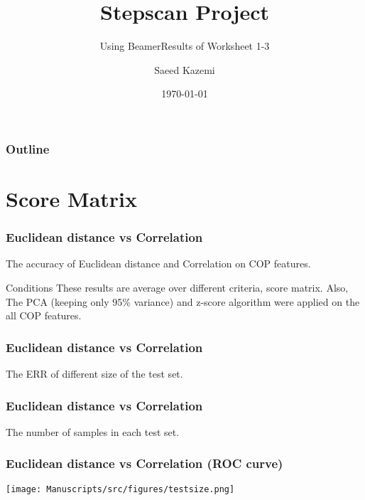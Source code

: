 \documentclass{beamer}
\subtitle{Using Beamer}
\title{ \textbf{Stepscan Project}}
\subtitle{Results of Worksheet 1-3}
\date{\today}
\author{Saeed Kazemi}
\institute{ University of New Brunswick}
\begin{document}
\begin{frame}
\titlepage
\end{frame}


\begin{frame}
\frametitle{Outline}
\tableofcontents
\end{frame}


\section{Score Matrix}

\begin{frame}
\frametitle{Euclidean distance vs Correlation}
\tiny
\begin{table}
\centering
\captionsetup{labelformat=empty}
\caption{\small The accuracy of Euclidean distance and Correlation on COP features.}

\end{table}
\begin{block}{\small Conditions}
    \footnotesize These results are average over different criteria, score matrix. Also, The PCA (keeping only 95\% variance) and z-score algorithm were applied on the all COP features.
\end{block}

\end{frame}
\begin{frame}
\frametitle{Euclidean distance vs Correlation}
\tiny
\begin{table}
\centering
\captionsetup{labelformat=empty}
\caption{\small The  ERR of different size of the test set.}
\label{tab:parameters condition}

\end{table}
\end{frame}
\begin{frame}
\frametitle{Euclidean distance vs Correlation}
\tiny
\begin{table}
\centering
\captionsetup{labelformat=empty}
\caption{\small The number of samples in each test set.}
\label{tab:parameters condition}

\end{table}
\end{frame}


\begin{frame}
\centering
\frametitle{Euclidean distance vs Correlation (ROC curve)}
\texttt{[image: Manuscripts/src/figures/testsize.png]}
\end{frame}
\end{document}
